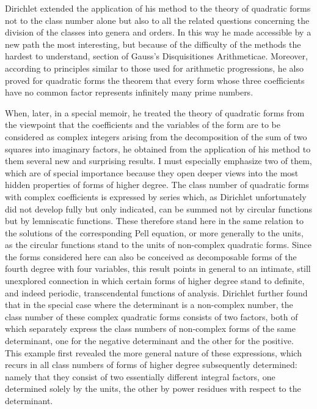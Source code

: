 \documentclass[11pt]{article}
\begin{document}
Dirichlet extended the application of his method to the theory of quadratic forms not to the class number alone but also to all the related questions concerning the division of the classes into genera and orders. In this way he made accessible by a new path the most interesting, but because of the difficulty of the methods the hardest to understand, section of Gauss's Disquisitiones Arithmeticae. Moreover, according to principles similar to those used for arithmetic progressions, he also proved for quadratic forms the theorem that every form whose three coefficients have no common factor represents infinitely many prime numbers.

When, later, in a special memoir, he treated the theory of quadratic forms from the viewpoint that the coefficients and the variables of the form are to be considered as complex integers arising from the decomposition of the sum of two squares into imaginary factors, he obtained from the application of his method to them several new and surprising results. I must especially emphasize two of them, which are of special importance because they open deeper views into the most hidden properties of forms of higher degree. The class number of quadratic forms with complex coefficients is expressed by series which, as Dirichlet unfortunately did not develop fully but only indicated, can be summed not by circular functions but by lemniscatic functions. These therefore stand here in the same relation to the solutions of the corresponding Pell equation, or more generally to the units, as the circular functions stand to the units of non-complex quadratic forms. Since the forms considered here can also be conceived as decomposable forms of the fourth degree with four variables, this result points in general to an intimate, still unexplored connection in which certain forms of higher degree stand to definite, and indeed periodic, transcendental functions of analysis. Dirichlet further found that in the special case where the determinant is a non-complex number, the class number of these complex quadratic forms consists of two factors, both of which separately express the class numbers of non-complex forms of the same determinant, one for the negative determinant and the other for the positive. This example first revealed the more general nature of these expressions, which recurs in all class numbers of forms of higher degree subsequently determined: namely that they consist of two essentially different integral factors, one determined solely by the units, the other by power residues with respect to the determinant.
\end{document}
